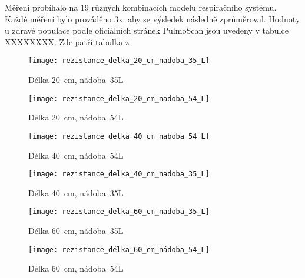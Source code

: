 Měření probíhalo na 19 různých kombinacích modelu respiračního systému. Každé měření bylo prováděno 3x, aby se výsledek následně zprůměroval. 
Hodnoty u zdravé populace podle oficiálních stránek PulmoScan jsou uvedeny v tabulce XXXXXXXX.
Zde patří tabulka z \cite{PulmoScan}

\begin{figure}[h]
	\label{img:pic_rezistance_delka_20_cm_nadoba_35_L}
	\begin{center}
		\texttt{[image: rezistance\_delka\_20\_cm\_nadoba\_35\_L]}
		\caption{Délka 20~cm, nádoba~35L}
	\end{center}
\end{figure}

\begin{figure}[h]
	\label{img:pic_rezistance_delka_20_cm_nadoba_54_L}
	\begin{center}
		\texttt{[image: rezistance\_delka\_20\_cm\_nadoba\_54\_L]}
		\caption{Délka 20~cm, nádoba~54L}
	\end{center}
\end{figure}

\begin{figure}[h]
	\label{img:pic_rezistance_delka_40_cm_naboba_54_L}
	\begin{center}
		\texttt{[image: rezistance\_delka\_40\_cm\_naboba\_54\_L]}
		\caption{Délka 40~cm, nádoba~54L}
	\end{center}
\end{figure}

\begin{figure}[h]
	\label{img:pic_rezistance_delka_40_cm_nadoba_35_L}
	\begin{center}
		\texttt{[image: rezistance\_delka\_40\_cm\_nadoba\_35\_L]}
		\caption{Délka 40~cm, nádoba~35L}
	\end{center}
\end{figure}

\begin{figure}[h]
	\label{img:pic_rezistance_delka_60_cm_nadoba_35_L}
	\begin{center}
		\texttt{[image: rezistance\_delka\_60\_cm\_nadoba\_35\_L]}
		\caption{Délka 60~cm, nádoba~35L}
	\end{center}
\end{figure}

\begin{figure}[h]
	\label{img:pic_rezistance_délka_60_cm_nádoba_54_L}
	\begin{center}
		\texttt{[image: rezistance\_délka\_60\_cm\_nádoba\_54\_L]}
		\caption{Délka 60~cm, nádoba~54L}
	\end{center}
\end{figure}


